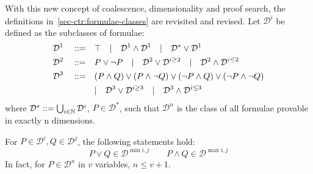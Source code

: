     \begin{definition*}
        With this new concept of coalescence, dimensionality and proof search, the definitions in~\ref{sec-ctr:formulae-classes} are revisited and revised.
        Let $\mathcal{D}^i$ be defined as the subclasses of formulae:
        \begin{align*}
            \mathcal{D}^1 \quad ::= \quad &\top \quad | \quad \mathcal{D}^1 \wedge \mathcal{D}^1 \quad | \quad \mathcal{D}^* \vee \mathcal{D}^1 \\
            \mathcal{D}^2 \quad ::= \quad &P \vee \neg P \quad | \quad \mathcal{D}^2 \vee \mathcal{D}^{i \geq 2} \quad | \quad \mathcal{D}^2 \wedge \mathcal{D}^{i \leq 2} \\
            \mathcal{D}^3 \quad ::= \quad &(P \wedge Q) \vee (P \wedge \neg Q) \vee (\neg P \wedge Q) \vee (\neg P \wedge \neg Q) \\
                                       \quad &| \quad \mathcal{D}^3 \vee \mathcal{D}^{i \geq 3} \quad | \quad \mathcal{D}^3 \wedge \mathcal{D}^{i \leq 3}
        \end{align*}
        where $\mathcal{D}^* ::= \bigcup_{i \in \mathbb{N}} \mathcal{D}^i$, $P \in \mathcal{D}^*$, such that $\mathcal{D}^n$ is the class of all formulae provable in exactly n dimensions.
    \end{definition*}
    
    \begin{corollary}\label{cory:dimensionality-algebra}
        For $P \in \mathcal{D}^i, Q \in \mathcal{D}^j$, the following statements hold:
        \begin{equation*}
            P \vee Q \in \mathcal{D}^{\min{i, j}}
            \qquad
            P \wedge Q \in \mathcal{D}^{\max{i, j}}
        \end{equation*}
        In fact, for $P \in \mathcal{D}^n$ in $v$ variables, $n \leq v + 1$.
    \end{corollary}


